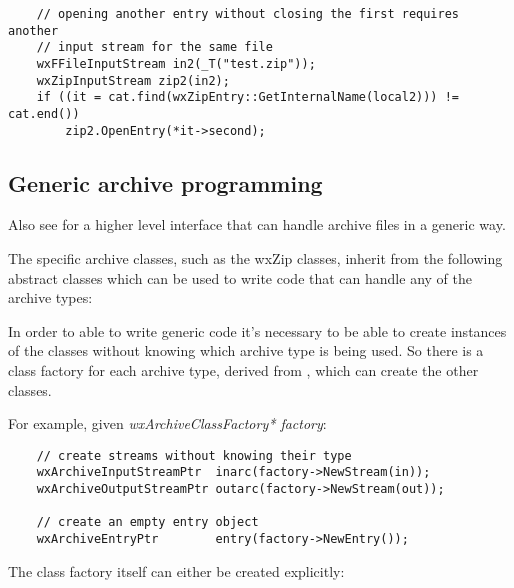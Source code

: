 \begin{verbatim}
    // opening another entry without closing the first requires another
    // input stream for the same file
    wxFFileInputStream in2(_T("test.zip"));
    wxZipInputStream zip2(in2);
    if ((it = cat.find(wxZipEntry::GetInternalName(local2))) != cat.end())
        zip2.OpenEntry(*it->second);

\end{verbatim}


\subsection{Generic archive programming}\label{wxarcgeneric}


Also see  for a higher level interface that
can handle archive files in a generic way.

The specific archive classes, such as the wxZip classes, inherit from
the following abstract classes which can be used to write code that can
handle any of the archive types:

\begin{twocollist}\twocolwidtha{5cm}
\end{twocollist}

In order to able to write generic code it's necessary to be able to create
instances of the classes without knowing which archive type is being used.
So there is a class factory for each archive type, derived from
 , which can create
the other classes.

For example, given {\it wxArchiveClassFactory* factory}:

\begin{verbatim}
    // create streams without knowing their type
    wxArchiveInputStreamPtr  inarc(factory->NewStream(in));
    wxArchiveOutputStreamPtr outarc(factory->NewStream(out));

    // create an empty entry object
    wxArchiveEntryPtr        entry(factory->NewEntry());

\end{verbatim}

The class factory itself can either be created explicitly:

